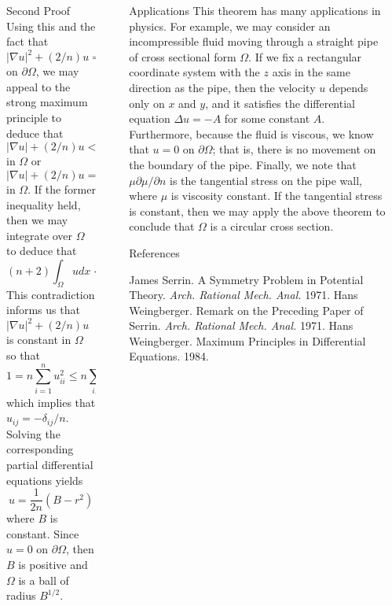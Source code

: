\documentclass[final]{beamer}
\newlength{\sepwidth}
\newlength{\colwidth}
\newcommand{\separatorcolumn}{\begin{column}{\sepwidth}\end{column}}
\begin{document}
\begin{frame}[t]
\begin{columns}[t]
\begin{column}{\colwidth}
\begin{block}{Second Proof}
\[\] Using this and the fact that $\vert \nabla u \vert^2 + (2/n)u = c^2$ on $\partial{\Omega}$, we may appeal to the strong maximum principle to deduce that $\vert \nabla u \vert + (2/n)u < c^2$ in $\Omega$ or $\vert \nabla u \vert + (2/n)u = c^2$ in $\Omega$. If the former inequality held, then we may integrate over $\Omega$ to deduce that
\[
(n+2)\int_\Omega u dx < nc^2V
\] This contradiction informs us that $\vert \nabla u \vert^2 + (2/n)u$ is constant in $\Omega$ so that
\[
1 = n \sum_{i=1}^n u_{ii}^2 \leq n \sum_{i,j} u_{ij}^2
\] which implies that $u_{ij} = -\delta_{ij}/n$. Solving the corresponding partial differential equations yields
\[
u = \frac{1}{2n}(B - r^2)
\] where $B$ is constant. Since $u = 0$ on $\partial{\Omega}$, then $B$ is positive and $\Omega$ is a ball of radius $B^{1/2}$.
  \end{block} 


\end{column}

\separatorcolumn

\begin{column}{\colwidth}

  \begin{block}{Applications}
 This theorem has many applications in physics. For example, we may consider an incompressible fluid moving through a straight pipe of cross sectional form $\Omega$. If we fix a rectangular coordinate system with the $z$ axis in the same direction as the pipe, then the velocity $u$ depends only on $x$ and $y$, and it satisfies the differential equation $\Delta u = -A$ for some constant $A$. Furthermore, because the fluid is viscous, we know that $u = 0$ on $\partial{\Omega}$; that is, there is no movement on the boundary of the pipe. Finally, we note that $\mu\partial{\mu}/\partial{n}$ is the tangential stress on the pipe wall, where $\mu$ is viscosity constant. If the tangential stress is constant, then we may apply the above theorem to conclude that $\Omega$ is a circular cross section.
  \end{block}

\begin{block}{References}
\begin{thebibliography}{9}
\footnotesize
{}
James Serrin. A Symmetry Problem in Potential Theory. \emph{Arch. Rational Mech. Anal.} 1971.
Hans Weingberger. Remark on the Preceding Paper of Serrin. \emph{Arch. Rational Mech. Anal.} 1971.
Hans Weingberger. Maximum Principles in Differential Equations. 1984.
\end{thebibliography}
	

\end{block}

\end{column}

\separatorcolumn
\end{columns}
\end{frame}
\end{document}
